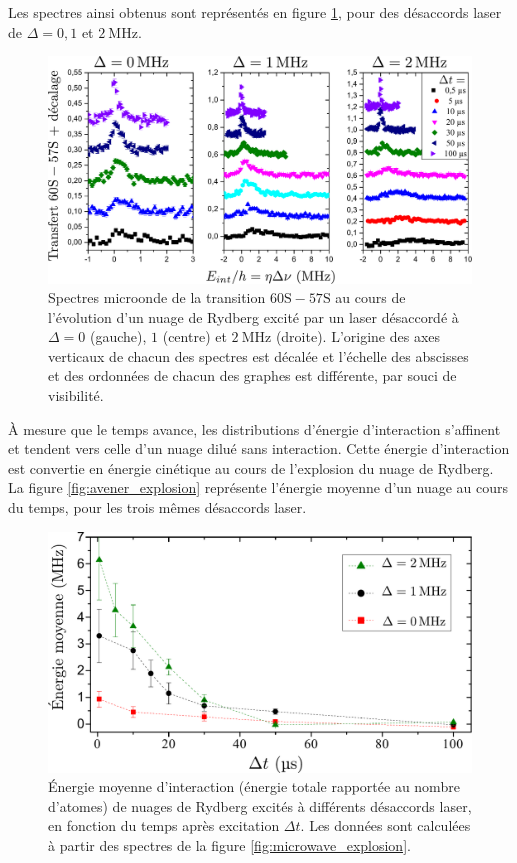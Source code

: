 Les spectres ainsi obtenus sont représentés en figure \ref{fig:microwave_explosion}, pour des désaccords laser de $\Delta = 0, 1$ et $\SI{2}{\MHz}$.
%
\begin{figure}[h]
\centering
\includegraphics[width=\linewidth]{figures/low_l/expansion_012MHz}
\caption[Spectroscopie microonde de l'expansion du nuage]{
Spectres microonde de la transition $\mathrm{60S-57S}$ au cours de l'évolution d'un nuage de Rydberg excité par un laser désaccordé à $\Delta= 0$ (gauche), $1$ (centre) et $\SI{2}{\MHz}$ (droite).
L'origine des axes verticaux de chacun des spectres est décalée et l'échelle des abscisses et des ordonnées de chacun des graphes est différente, par souci de visibilité.
}
\label{fig:microwave_explosion}
\end{figure}
%
\`A mesure que le temps avance, les distributions d'énergie d'interaction s'affinent et tendent vers celle d'un nuage dilué sans interaction.
Cette énergie d'interaction est convertie en énergie cinétique au cours de l'explosion du nuage de Rydberg.
La figure \eqref{fig:avener_explosion} représente l'énergie moyenne d'un nuage au cours du temps, pour les trois mêmes désaccords laser.
%
\begin{figure}[h]
\centering
\includegraphics[width=\linewidth]{figures/low_l/energie_moyenne_explosion}
\caption[Énergie moyenne au cours de l'expansion du nuage]{
Énergie moyenne d'interaction (énergie totale rapportée au nombre d'atomes) de nuages de Rydberg excités à différents désaccords laser, en fonction du temps après excitation $\Delta t$.
Les données sont calculées à partir des spectres de la figure \eqref{fig:microwave_explosion}.
}
\label{fig:avener_explosion}
\end{figure}
